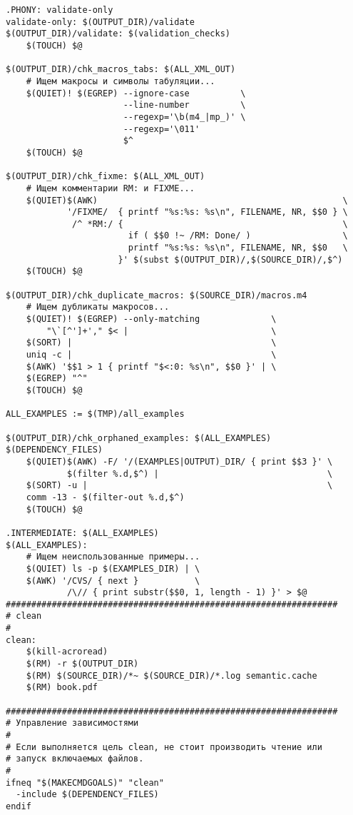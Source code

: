 \begin{verbatim}
.PHONY: validate-only
validate-only: $(OUTPUT_DIR)/validate
$(OUTPUT_DIR)/validate: $(validation_checks)
    $(TOUCH) $@

$(OUTPUT_DIR)/chk_macros_tabs: $(ALL_XML_OUT)
    # Ищем макросы и символы табуляции...
    $(QUIET)! $(EGREP) --ignore-case          \
                       --line-number          \
                       --regexp='\b(m4_|mp_)' \
                       --regexp='\011'
                       $^
    $(TOUCH) $@

$(OUTPUT_DIR)/chk_fixme: $(ALL_XML_OUT)
    # Ищем комментарии RM: и FIXME...
    $(QUIET)$(AWK)                                                \
            '/FIXME/  { printf "%s:%s: %s\n", FILENAME, NR, $$0 } \
             /^ *RM:/ {                                           \
                        if ( $$0 !~ /RM: Done/ )                  \
                        printf "%s:%s: %s\n", FILENAME, NR, $$0   \
                      }' $(subst $(OUTPUT_DIR)/,$(SOURCE_DIR)/,$^) 
    $(TOUCH) $@ 

$(OUTPUT_DIR)/chk_duplicate_macros: $(SOURCE_DIR)/macros.m4
    # Ищем дубликаты макросов...
    $(QUIET)! $(EGREP) --only-matching              \
        "\`[^']+'," $< |                            \
    $(SORT) |                                       \
    uniq -c |                                       \
    $(AWK) '$$1 > 1 { printf "$<:0: %s\n", $$0 }' | \
    $(EGREP) "^"
    $(TOUCH) $@

ALL_EXAMPLES := $(TMP)/all_examples

$(OUTPUT_DIR)/chk_orphaned_examples: $(ALL_EXAMPLES) $(DEPENDENCY_FILES)
    $(QUIET)$(AWK) -F/ '/(EXAMPLES|OUTPUT)_DIR/ { print $$3 }' \
            $(filter %.d,$^) |                                 \
    $(SORT) -u |                                               \
    comm -13 - $(filter-out %.d,$^)
    $(TOUCH) $@

.INTERMEDIATE: $(ALL_EXAMPLES)
$(ALL_EXAMPLES):
    # Ищем неиспользованные примеры...
    $(QUIET) ls -p $(EXAMPLES_DIR) | \
    $(AWK) '/CVS/ { next }           \
            /\// { print substr($$0, 1, length - 1) }' > $@
#################################################################
# clean
#
clean:
    $(kill-acroread)
    $(RM) -r $(OUTPUT_DIR)
    $(RM) $(SOURCE_DIR)/*~ $(SOURCE_DIR)/*.log semantic.cache
    $(RM) book.pdf

#################################################################
# Управление зависимостями
#
# Если выполняется цель clean, не стоит производить чтение или
# запуск включаемых файлов.
#
ifneq "$(MAKECMDGOALS)" "clean"
  -include $(DEPENDENCY_FILES)
endif


\end{verbatim}
